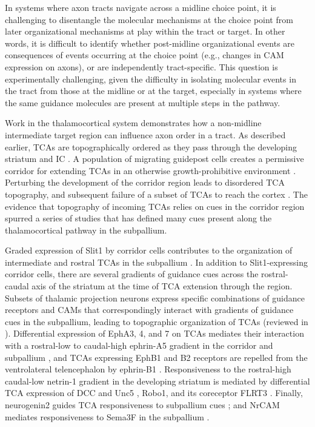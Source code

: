 In systems where axon tracts navigate across a midline choice point, it is challenging to disentangle the molecular mechanisms at the choice point from later organizational mechanisms at play within the tract or target.
In other words, it is difficult to identify whether post-midline organizational events are consequences of events occurring at the choice point (e.g., changes in CAM expression on axons), or are independently tract-specific.
This question is experimentally challenging, given the difficulty in isolating molecular events in the tract from those at the midline or at the target, especially in systems where the same guidance molecules are present at multiple steps in the pathway. 

Work in the thalamocortical system demonstrates how a non-midline intermediate target region can influence axon order in a tract. 
As described earlier, TCAs are topographically ordered as they pass through the developing striatum and IC \cite{garel2014inputs}.
A population of migrating guidepost cells creates a permissive corridor for extending TCAs in an otherwise growth-prohibitive environment \cite{bielle2011emergent,lopez2006tangential}. 
Perturbing the development of the corridor region leads to disordered TCA topography, and subsequent failure of a subset of TCAs to reach the cortex \cite{garel2002early}. 
The evidence that topography of incoming TCAs relies on cues in the corridor region spurred a series of studies that has defined many cues present along the thalamocortical pathway in the subpallium. 

Graded expression of Slit1 by corridor cells contributes to the organization of intermediate and rostral TCAs in the subpallium \cite{bielle2011emergent}. 
In addition to Slit1-expressing corridor cells, there are several gradients of guidance cues across the rostral-caudal axis of the striatum at the time of TCA extension through the region. 
Subsets of thalamic projection neurons express specific combinations of guidance receptors and CAMs that correspondingly interact with gradients of guidance cues in the subpallium, leading to topographic organization of TCAs (reviewed in ). 
Differential expression of EphA3, 4, and 7 on TCAs mediates their interaction with a rostral-low to caudal-high ephrin-A5 gradient in the corridor and subpallium \cite{dufour2003area}, and TCAs expressing EphB1 and B2 receptors are repelled from the ventrolateral telencephalon by ephrin-B1 \cite{robichaux2014ephb}.
Responsiveness to the rostral-high caudal-low netrin-1 gradient in the developing striatum is mediated by differential TCA expression of DCC and Unc5 \cite{powell2008topography}, Robo1, and its coreceptor FLRT3 \cite{leyva2014flrt3}.
Finally, neurogenin2 guides TCA responsiveness to subpallium cues \cite{seibt2003neurogenin2}; and NrCAM mediates responsiveness to Sema3F in the subpallium \cite{demyanenko2011nrcam}. 

